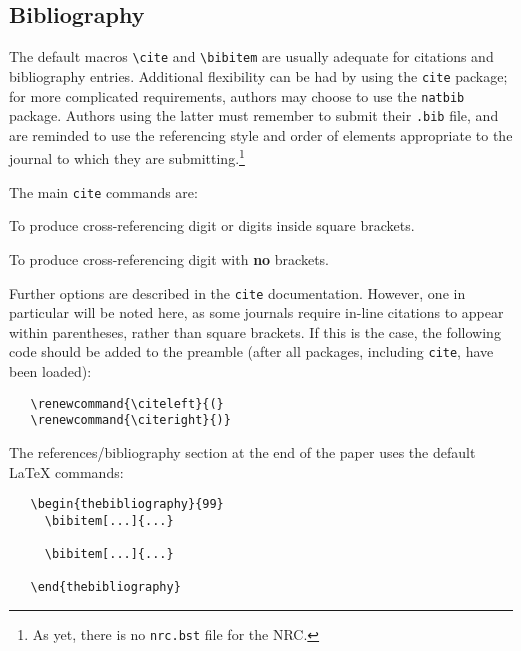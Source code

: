 \subsection{Bibliography} 

The default macros \verb|\cite| and \verb|\bibitem| are usually
adequate for citations and bibliography entries. Additional
flexibility can be had by using the \verb|cite| package; for more
complicated requirements, authors may choose to use the \verb|natbib|
package. Authors using the latter must remember to submit their
\verb|.bib| file, and are reminded to use the referencing style and
order of elements appropriate to the journal to which they are
submitting.\footnote{As yet, there is no \texttt{nrc.bst} file for the
NRC.}

The main \verb|cite| commands are:

\begin{description} \itemsep=0pt
   \item [{\tt \blash cite\char`\{...\char`\}}] \mbox{}

         To produce cross-referencing digit or digits inside square
         brackets.

   \item [{\tt \blash citen\char`\{...\char`\}}] \mbox{}

         To produce cross-referencing digit with {\bf no} brackets.
\end{description}

\noindent Further options are described in the \verb|cite|
documentation. However, one in particular will be noted here, as some
\NRC{} journals require in-line citations to appear within
parentheses, rather than square brackets. If this is the case, the
following code should be added to the preamble (after all packages,
including \verb|cite|, have been loaded):

\begin{verbatim}
   \renewcommand{\citeleft}{(}
   \renewcommand{\citeright}{)}
\end{verbatim}

The references/bibliography section at the end of the paper uses the
default \LaTeX{} commands:

\begin{verbatim}
   \begin{thebibliography}{99}
     \bibitem[...]{...}

     \bibitem[...]{...}

   \end{thebibliography}
\end{verbatim}


